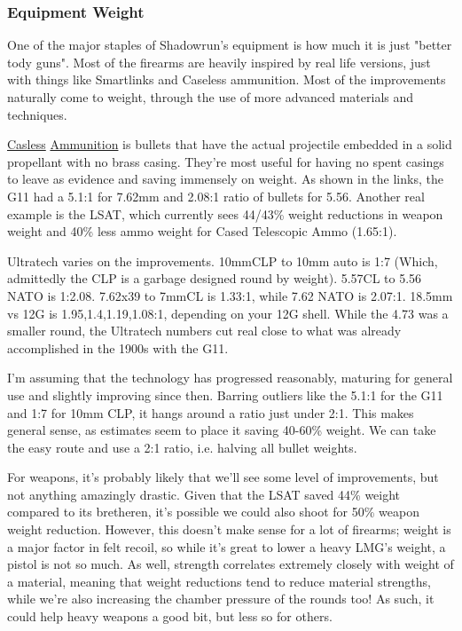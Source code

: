\begin{multicols*}{2}
	\subsubsection{Equipment Weight}
	
	One of the major staples of Shadowrun's equipment is how much it is just "better tody guns". Most of the firearms are heavily inspired by real life versions, just with things like Smartlinks and Caseless ammunition. Most of the improvements naturally come to weight, through the use of more advanced materials and techniques.
	
	\textcolor{NavyBlue}{\href{http://futurewarstories.blogspot.com/2012/10/fws-armory-caseless-ammunition.html}{Casless}} \textcolor{Blue}{\href{http://www.projectrho.com/public_html/rocket/sidearmslug.php}{Ammunition}} is bullets that have the actual projectile embedded in a solid propellant with no brass casing. They're most useful for having no spent casings to leave as evidence and saving immensely on weight. As shown in the links, the G11 had a 5.1:1 for 7.62mm and 2.08:1 ratio of bullets for 5.56. Another real example is the LSAT, which currently sees 44/43\% weight reductions in weapon weight and 40\% less ammo weight for Cased Telescopic Ammo (1.65:1).
	
	Ultratech varies on the improvements. 10mmCLP to 10mm auto is 1:7 (Which, admittedly the CLP is a garbage designed round by weight). 5.57CL to 5.56 NATO is 1:2.08. 7.62x39 to 7mmCL is 1.33:1, while 7.62 NATO is 2.07:1. 18.5mm vs 12G is 1.95,1.4,1.19,1.08:1, depending on your 12G shell. While the 4.73 was a smaller round, the Ultratech numbers cut real close to what was already accomplished in the 1900s with the G11.
	
	 I'm assuming that the technology has progressed reasonably, maturing for general use and slightly improving since then. Barring outliers like the 5.1:1 for the G11 and 1:7 for 10mm CLP, it hangs around a ratio just under 2:1. This makes general sense, as estimates seem to place it saving 40-60\% weight. We can take the easy route and use a 2:1 ratio, i.e. halving all bullet weights.
	 
	 For weapons, it's probably likely that we'll see some level of improvements, but not anything amazingly drastic. Given that the LSAT saved 44\% weight compared to its bretheren, it's possible we could also shoot for 50\% weapon weight reduction. However, this doesn't make sense for a lot of firearms; weight is a major factor in felt recoil, so while it's great to lower a heavy LMG's weight, a pistol is not so much. As well, strength correlates extremely closely with weight of a material, meaning that weight reductions tend to reduce material strengths, while we're also increasing the chamber pressure of the rounds too! As such, it could help heavy weapons a good bit, but less so for others.
	 

\end{multicols*}
